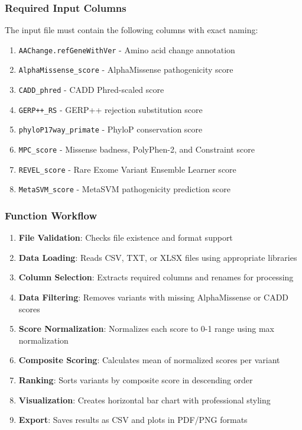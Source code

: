 \documentclass[
  11pt,
]{article}
\providecommand{\tightlist}{%
  \setlength{\itemsep}{0pt}\setlength{\parskip}{0pt}}
\begin{document}
\subsubsection{Required Input Columns}\label{required-input-columns}

The input file must contain the following columns with exact naming:

\begin{enumerate}
\def\labelenumi{\arabic{enumi}.}
\tightlist
\item
  \texttt{AAChange.refGeneWithVer} - Amino acid change annotation
\item
  \texttt{AlphaMissense\_score} - AlphaMissense pathogenicity score
\item
  \texttt{CADD\_phred} - CADD Phred-scaled score
\item
  \texttt{GERP++\_RS} - GERP++ rejection substitution score
\item
  \texttt{phyloP17way\_primate} - PhyloP conservation score
\item
  \texttt{MPC\_score} - Missense badness, PolyPhen-2, and Constraint
  score
\item
  \texttt{REVEL\_score} - Rare Exome Variant Ensemble Learner score
\item
  \texttt{MetaSVM\_score} - MetaSVM pathogenicity prediction score
\end{enumerate}

\subsubsection{Function Workflow}\label{function-workflow}

\begin{enumerate}
\def\labelenumi{\arabic{enumi}.}
\tightlist
\item
  \textbf{File Validation}: Checks file existence and format support
\item
  \textbf{Data Loading}: Reads CSV, TXT, or XLSX files using appropriate
  libraries
\item
  \textbf{Column Selection}: Extracts required columns and renames for
  processing
\item
  \textbf{Data Filtering}: Removes variants with missing AlphaMissense
  or CADD scores
\item
  \textbf{Score Normalization}: Normalizes each score to 0-1 range using
  max normalization
\item
  \textbf{Composite Scoring}: Calculates mean of normalized scores per
  variant
\item
  \textbf{Ranking}: Sorts variants by composite score in descending
  order
\item
  \textbf{Visualization}: Creates horizontal bar chart with professional
  styling
\item
  \textbf{Export}: Saves results as CSV and plots in PDF/PNG formats
\end{enumerate}
\end{document}
